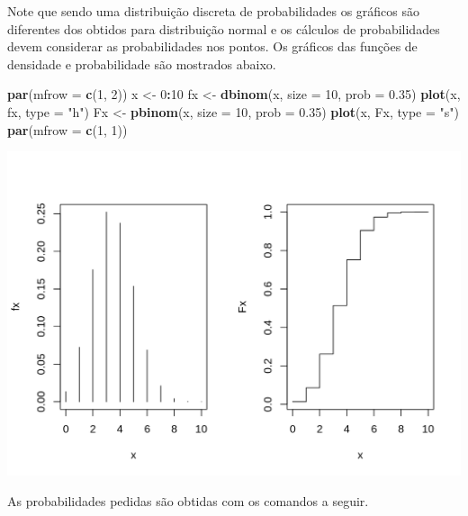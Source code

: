 \documentclass[10pt,a4paper]{book}
\newenvironment{Shaded}{\begin{snugshade}}{\end{snugshade}}
\newcommand{\KeywordTok}[1]{\textcolor[rgb]{0.13,0.29,0.53}{\textbf{#1}}}
\newcommand{\DataTypeTok}[1]{\textcolor[rgb]{0.13,0.29,0.53}{#1}}
\newcommand{\DecValTok}[1]{\textcolor[rgb]{0.00,0.00,0.81}{#1}}
\newcommand{\FloatTok}[1]{\textcolor[rgb]{0.00,0.00,0.81}{#1}}
\newcommand{\StringTok}[1]{\textcolor[rgb]{0.31,0.60,0.02}{#1}}
\newcommand{\OperatorTok}[1]{\textcolor[rgb]{0.81,0.36,0.00}{\textbf{#1}}}
\newcommand{\NormalTok}[1]{#1}
\begin{document}
Note que sendo uma distribuição discreta de probabilidades os gráficos
são diferentes dos obtidos para distribuição normal e os cálculos de
probabilidades devem considerar as probabilidades nos pontos. Os
gráficos das funções de densidade e probabilidade são mostrados abaixo.

\begin{Shaded}
\begin{Highlighting}[]
\KeywordTok{par}\NormalTok{(}\DataTypeTok{mfrow =} \KeywordTok{c}\NormalTok{(}\DecValTok{1}\NormalTok{, }\DecValTok{2}\NormalTok{))}
\NormalTok{x <-}\StringTok{ }\DecValTok{0}\OperatorTok{:}\DecValTok{10}
\NormalTok{fx <-}\StringTok{ }\KeywordTok{dbinom}\NormalTok{(x, }\DataTypeTok{size =} \DecValTok{10}\NormalTok{, }\DataTypeTok{prob =} \FloatTok{0.35}\NormalTok{)}
\KeywordTok{plot}\NormalTok{(x, fx, }\DataTypeTok{type =} \StringTok{"h"}\NormalTok{)}
\NormalTok{Fx <-}\StringTok{ }\KeywordTok{pbinom}\NormalTok{(x, }\DataTypeTok{size =} \DecValTok{10}\NormalTok{, }\DataTypeTok{prob =} \FloatTok{0.35}\NormalTok{)}
\KeywordTok{plot}\NormalTok{(x, Fx, }\DataTypeTok{type =} \StringTok{"s"}\NormalTok{)}
\KeywordTok{par}\NormalTok{(}\DataTypeTok{mfrow =} \KeywordTok{c}\NormalTok{(}\DecValTok{1}\NormalTok{, }\DecValTok{1}\NormalTok{))}
\end{Highlighting}
\end{Shaded}

\begin{center}\includegraphics{figures/unnamed-chunk-348-1} \end{center}

As probabilidades pedidas são obtidas com os comandos a seguir.
\end{document}
